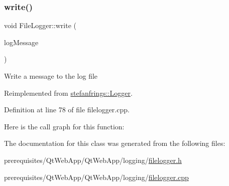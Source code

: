 \subsubsection{\texorpdfstring{write()}{write()}}
{\footnotesize\ttfamily void File\+Logger\+::write (\begin{DoxyParamCaption}\item[{const \mbox{\hyperlink{classstefanfrings_1_1_log_message}{Log\+Message}} $\ast$}]{log\+Message }\end{DoxyParamCaption})\hspace{0.3cm}{\ttfamily [virtual]}}

Write a message to the log file 

Reimplemented from \mbox{\hyperlink{classstefanfrings_1_1_logger_a69f50fe67efaa254ee219f6de384e9fa}{stefanfrings\+::\+Logger}}.



Definition at line 78 of file filelogger.\+cpp.

Here is the call graph for this function\+:


The documentation for this class was generated from the following files\+:\begin{DoxyCompactItemize}
\item 
prerequisites/\+Qt\+Web\+App/\+Qt\+Web\+App/logging/\mbox{\hyperlink{filelogger_8h}{filelogger.\+h}}\item 
prerequisites/\+Qt\+Web\+App/\+Qt\+Web\+App/logging/\mbox{\hyperlink{filelogger_8cpp}{filelogger.\+cpp}}\end{DoxyCompactItemize}
